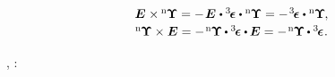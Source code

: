 \nopagebreak\vspace{-0.2em}\begin{equation*}\begin{array}{c}
\UnitDyad \hspace{.1ex} \times \hspace{-0.1ex} {^\mathrm{n}\hspace{-0.12ex}\bm{\Upsilon}}
= - \hspace{.2ex} \UnitDyad \hspace{.1ex} \dotp \levicivitatensor \dotp {^\mathrm{n}\hspace{-0.12ex}\bm{\Upsilon}}
= - \hspace{.2ex} \levicivitatensor \dotp {^\mathrm{n}\hspace{-0.12ex}\bm{\Upsilon}} \hspace{-0.15ex},
\\[.2em]
%
{^\mathrm{n}\hspace{-0.12ex}\bm{\Upsilon}} \times \UnitDyad
= - \hspace{.2ex} {^\mathrm{n}\hspace{-0.12ex}\bm{\Upsilon}} \hspace{-0.1ex} \dotp \levicivitatensor \dotp \hspace{-0.1ex} \UnitDyad
= - \hspace{.2ex} {^\mathrm{n}\hspace{-0.12ex}\bm{\Upsilon}} \hspace{-0.1ex} \dotp \levicivitatensor
\hspace{.1ex} .
\end{array}\end{equation*}

\vspace{-0.1em}
,
:

